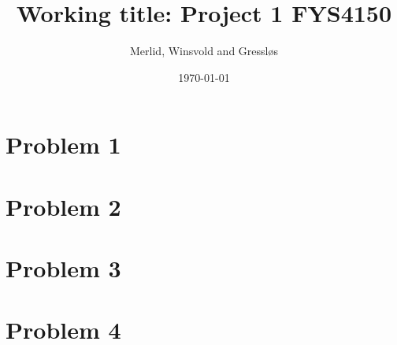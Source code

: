 \documentclass[aps,rmp,reprint,amsmath,amssymb,longbibliography,twocolumn,floatfix]{revtex4-1}
\begin{document}
\title{Working title: Project 1 FYS4150}

\author{Merlid, Winsvold and Gressløs}
\date{\today}


\begin{abstract}

\end{abstract}

\maketitle

\tableofcontents

\section{Problem 1}
\label{sec:prob1}


\section{Problem 2}
\label{sec:prob2}


\section{Problem 3}
\label{sec:prob3}


\section{Problem 4}
\label{sec:prob4}






\newpage

\appendix

\end{document}

